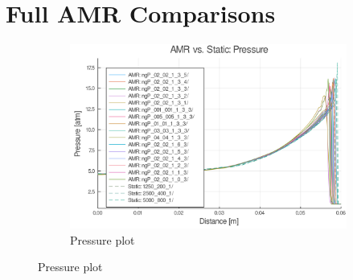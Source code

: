 \chapter{Full AMR Comparisons}
\begin{figure}[H]
    \centering
    \begin{subfigure}[]{\textwidth}
        \centering
        \includegraphics[width=\textwidth]{./figs/amrfigs/amrcompare_all/p.png}
        \caption{Pressure plot}
    \end{subfigure}

\end{figure}
